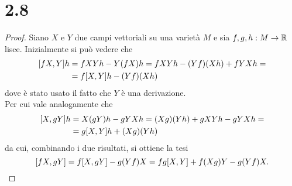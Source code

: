 \documentclass[italian,a4paper,11pt]{article}
\begin{document}
\section*{2.8}
\begin{proof}
Siano $X$ e $Y$ due campi vettoriali su una varietà $M$ e sia $f,g,h:M \rightarrow \mathbb R$ lisce. Inizialmente si può vedere che
\begin{align*}
\comm{fX}{Y}h &= fXYh - Y(fX)h = fXYh - (Yf)(Xh) + fYXh =\\
&= f\comm{X}{Y}h - (Yf)(Xh)
\end{align*}
dove è stato usato il fatto che $Y$ è una derivazione.\\
Per cui vale analogamente che 
\begin{align*}
\comm{X}{gY}h &= X(gY)h - gYXh = (Xg)(Yh) + gXYh - gYXh = \\
&= g\comm{X}{Y}h + (Xg)(Yh)
\end{align*} 
da cui, combinando i due risultati, si ottiene la tesi
\begin{equation*}
\comm{fX}{gY} = f\comm{X}{gY} - g(Yf)X = fg\comm{X}{Y} + f(Xg)Y - g(Yf)X.
\end{equation*}
\end{proof}
\end{document}
